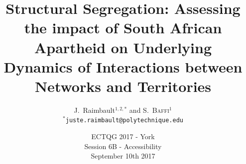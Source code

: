 \documentclass[english,11pt]{beamer}
\newcommand{\noun}[1]{\textsc{#1}}
\begin{document}
\title{Structural Segregation: Assessing the impact of South African Apartheid on Underlying Dynamics of Interactions between Networks and Territories}

\author{J.~Raimbault$^{1,2,\ast}$ and \noun{S.~Baffi}$^{1}$\\
$^{\ast}$\texttt{juste.raimbault@polytechnique.edu}
}




\date{ECTQG 2017 - York\\\smallskip
Session 6B  - Accessibility\\\smallskip
September 10th 2017
}

\frame{\maketitle}









\end{document}
